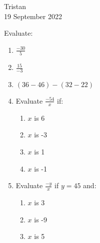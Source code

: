 \documentclass[14pt]{extarticle} %
\begin{document}
\hfill Tristan\\
\null\hfill 19 September 2022

\vspace{10mm}

Evaluate:
\begin{enumerate}[label=\Alph*.), itemsep=\fill]
\item  $\frac{-30}{5}$
\item  $\frac{15}{-3}$
\item  $(36-46)-(32-22)$
\vfill\clearpage
\item Evaluate $\frac{-54}{x}$ if:
    \begin{enumerate}[itemsep=\fill]
    \item $x$ is 6
    \item $x$ is -3
    \item $x$ is 1
    \item $x$ is -1
    \vfill\end{enumerate}
\item Evaluate $\frac{-y}{x}$ if $y=45$ and:
    \begin{enumerate}[itemsep=\fill]
    \item $x$ is 3
    \item $x$ is -9
    \item $x$ is 5
    \end{enumerate}
\vfill\end{enumerate}
\end{document}
